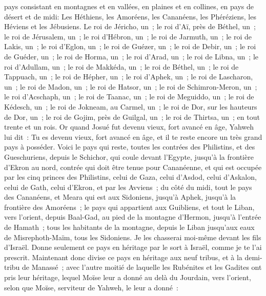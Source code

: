 \begin{multicols}{2}
pays consistant en montagnes et en vallées, en plaines et en collines, en pays de désert et de midi: Les Héthiens, les Amoréens, les Cananéens, les Phéréziens, les Héviens et les Jébusiens.
Le roi de Jéricho, un~; le roi d'Aï, près de Béthel, un~;
le roi de Jérusalem, un~; le roi d'Hébron, un~;
le roi de Jarmuth, un~; le roi de Lakis, un~;
le roi d'Eglon, un~; le roi de Guézer, un~;
le roi de Debir, un~; le roi de Guéder, un~;
le roi de Horma, un~; le roi d'Arad, un~;
le roi de Libna, un~; le roi d'Adullam, un~;
le roi de Makkéda, un~; le roi de Béthel, un~;
le roi de Tappuach, un~; le roi de Hépher, un~;
le roi d'Aphek, un~; le roi de Lascharon, un~;
le roi de Madon, un~; le roi de Hatsor, un~;
le roi de Schimron-Meron, un~; le roi d'Acschaph, un~;
le roi de Taanac, un~; le roi de Meguiddo, un~;
le roi de Kédesch, un~; le roi de Jokneam, au Carmel, un~;
le roi de Dor, sur les hauteurs de Dor, un~; le roi de Gojim, près de Guilgal, un~;
le roi de Thirtsa, un~; en tout trente et un rois.
\VerseOne{}Or quand Josué fut devenu vieux, fort avancé en âge, Yahweh lui dit~: Tu es devenu vieux, fort avancé en âge, et il te reste encore un très grand pays à posséder.
Voici le pays qui reste, toutes les contrées des Philistins, et des Gueschuriens,
depuis le Schichor, qui coule devant l'Egypte, jusqu'à la frontière d'Ekron au nord, contrée qui doit être tenue pour Cananéenne, et qui est occupée par les cinq princes des Philistins, celui de Gaza, celui d'Asdod, celui d'Askalon, celui de Gath, celui d'Ekron, et par les Avviens~;
du côté du midi, tout le pays des Cananéens, et Meara qui est aux Sidoniens, jusqu'à Aphek, jusqu'à la frontière des Amoréens~;
le pays qui appartient aux Guibliens, et tout le Liban, vers l'orient, depuis Baal-Gad, au pied de la montagne d'Hermon, jusqu'à l'entrée de Hamath~;
tous les habitants de la montagne, depuis le Liban jusqu'aux eaux de Misrephoth-Maïm, tous les Sidoniens. Je les chasserai moi-même devant les fils d'Israël. Donne seulement ce pays en héritage par le sort à Israël, comme je te l'ai prescrit.
Maintenant donc divise ce pays en héritage aux neuf tribus, et à la demi-tribu de Manassé~;
avec l'autre moitié de laquelle les Rubénites et les Gadites ont pris leur héritage, lequel Moïse leur a donné au delà du Jourdain, vers l'orient, selon que Moïse, serviteur de Yahweh, le leur a donné~:

\end{multicols}
